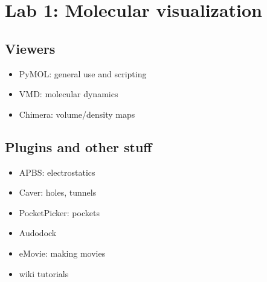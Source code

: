 \documentclass[10pt]{article}
\newenvironment{mitemize}
{
  \begin{itemize}
  \setlength{\itemsep}{1pt}
  \setlength{\parskip}{0pt}
  \setlength{\parsep}{0pt}}{\end{itemize}
}
\begin{document}
\section*{Lab 1: Molecular visualization}

\subsection*{Viewers}
\begin{mitemize}
  \item PyMOL: general use and scripting
  \item VMD: molecular dynamics
  \item Chimera: volume/density maps
\end{mitemize}

\subsection*{Plugins and other stuff}
\begin{mitemize}
  \item APBS: electrostatics
  \item Caver: holes, tunnels
  \item PocketPicker: pockets
  \item Audodock
  \item eMovie: making movies
  \item wiki tutorials
\end{mitemize}
\end{document}
